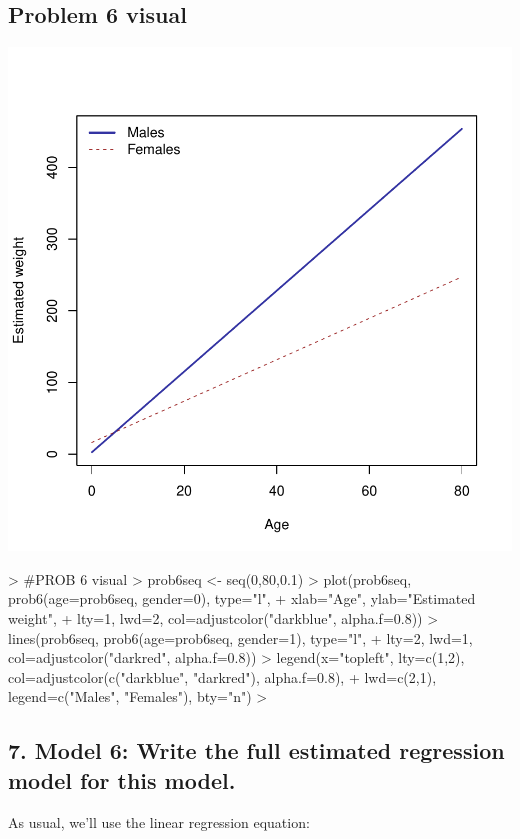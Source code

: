 \documentclass{article}
\begin{document}
\subsection*{Problem 6 visual}
\begin{center}
\includegraphics{exam2-012}
\end{center}
\begin{Schunk}
\begin{Sinput}
> #PROB 6 visual
> prob6seq <- seq(0,80,0.1)
> plot(prob6seq, prob6(age=prob6seq, gender=0), type="l",
+      xlab="Age", ylab="Estimated weight",
+      lty=1, lwd=2, col=adjustcolor("darkblue", alpha.f=0.8))
> lines(prob6seq, prob6(age=prob6seq, gender=1), type="l",
+       lty=2, lwd=1, col=adjustcolor("darkred", alpha.f=0.8))
> legend(x="topleft", lty=c(1,2), col=adjustcolor(c("darkblue", "darkred"), alpha.f=0.8),
+        lwd=c(2,1), legend=c("Males", "Females"), bty="n")
> 
\end{Sinput}
\end{Schunk}




\newpage
\subsection*{7. Model 6: Write the full estimated regression model for this model.}
As usual, we'll use the linear regression equation: \\
\end{document}
